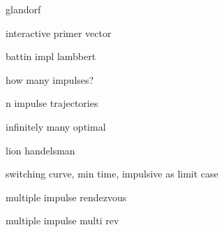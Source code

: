 glandorf

interactive primer vector

battin impl lambbert

how many impulses?

n impulse trajectories

infinitely many optimal

lion handelsman

switching curve, min time, impulsive as limit case

multiple impulse rendezvous

multiple impulse multi rev\cite{}
